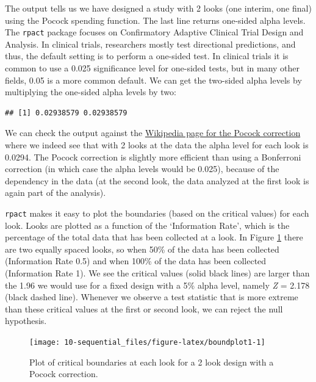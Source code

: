 \documentclass[
  oneside]{krantz}
\makeatletter
\newenvironment{Shaded}{\begin{snugshade}}{\end{snugshade}}
\newcommand{\DecValTok}[1]{\textcolor[rgb]{0.06,0.06,0.06}{#1}}
\newcommand{\NormalTok}[1]{#1}
\newcommand{\SpecialCharTok}[1]{\textcolor[rgb]{0,0,0}{#1}}
\newenvironment{kframe}{%
\medskip{}
\setlength{\fboxsep}{.8em}
 \def\at@end@of@kframe{}%
 \ifinner\ifhmode%
  \def\at@end@of@kframe{\end{minipage}}%
  \begin{minipage}{\columnwidth}%
 \fi\fi%
 \def\FrameCommand##1{\hskip\@totalleftmargin \hskip-\fboxsep
 \colorbox{shadecolor}{##1}\hskip-\fboxsep
     \hskip-\linewidth \hskip-\@totalleftmargin \hskip\columnwidth}%
 \MakeFramed {\advance\hsize-\width
   \@totalleftmargin\z@ \linewidth\hsize
   \@setminipage}}%
 {\par\unskip\endMakeFramed%
 \at@end@of@kframe}
\renewenvironment{Shaded}{\begin{kframe}}{\end{kframe}}
\makeatother
\begin{document}
The output tells us we have designed a study with 2 looks (one interim, one final) using the Pocock spending function. The last line returns one-sided alpha levels. The \texttt{rpact} package focuses on Confirmatory Adaptive Clinical Trial Design and Analysis. In clinical trials, researchers mostly test directional predictions, and thus, the default setting is to perform a one-sided test. In clinical trials it is common to use a 0.025 significance level for one-sided tests, but in many other fields, 0.05 is a more common default. We can get the two-sided alpha levels by multiplying the one-sided alpha levels by two:

\begin{Shaded}
\end{Shaded}

\begin{verbatim}
## [1] 0.02938579 0.02938579
\end{verbatim}

We can check the output against the \href{https://en.wikipedia.org/wiki/Pocock_boundary}{Wikipedia page for the Pocock correction} where we indeed see that with 2 looks at the data the alpha level for each look is 0.0294. The Pocock correction is slightly more efficient than using a Bonferroni correction (in which case the alpha levels would be 0.025), because of the dependency in the data (at the second look, the data analyzed at the first look is again part of the analysis).

\texttt{rpact} makes it easy to plot the boundaries (based on the critical values) for each look. Looks are plotted as a function of the `Information Rate', which is the percentage of the total data that has been collected at a look. In Figure \ref{fig:boundplot1} there are two equally spaced looks, so when 50\% of the data has been collected (Information Rate 0.5) and when 100\% of the data has been collected (Information Rate 1). We see the critical values (solid black lines) are larger than the 1.96 we would use for a fixed design with a 5\% alpha level, namely \emph{Z} = 2.178 (black dashed line). Whenever we observe a test statistic that is more extreme than these critical values at the first or second look, we can reject the null hypothesis.



\begin{figure}

{\centering \texttt{[image: 10-sequential\_files/figure-latex/boundplot1-1]} 

}

\caption{Plot of critical boundaries at each look for a 2 look design with a Pocock correction.}\label{fig:boundplot1}
\end{figure}
\end{document}
